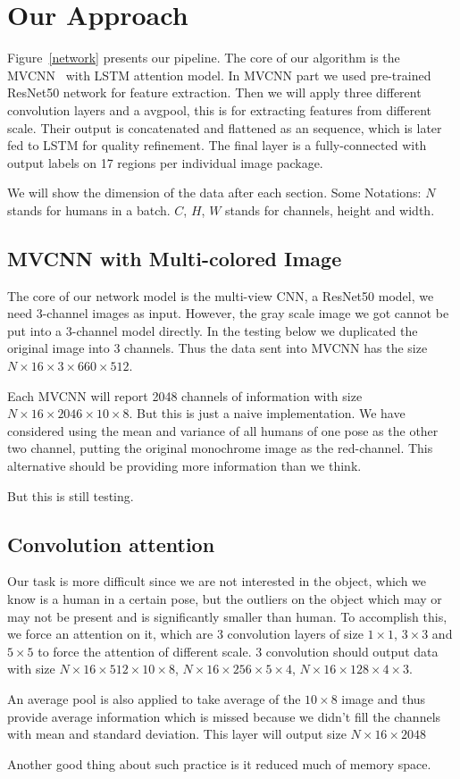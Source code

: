 \documentclass[conference,compsoc]{IEEEtran}
\begin{document}
\section{Our Approach}
Figure~\ref{network} presents our pipeline. The core of our algorithm is the MVCNN~\cite{su15mvcnn} with LSTM attention model. In MVCNN part we used pre-trained ResNet50\cite{he2016deep} network for feature extraction. Then we will apply three different convolution layers and a avgpool, this is for extracting features from different scale. Their output is concatenated and flattened as an sequence, which is later fed to LSTM for quality refinement. The final layer is a fully-connected with output labels on 17 regions per individual image package.
\par We will show the dimension of the data after each section. Some Notations: $N$ stands for humans in a batch. $C$, $H$, $W$ stands for channels, height and width.

\subsection{MVCNN with Multi-colored Image}
The core of our network model is the multi-view CNN, a ResNet50 model, we need 3-channel images as input. 
However, the gray scale image we got cannot be put into a 3-channel model directly. 
In the testing below we duplicated the original image into 3 channels. 
Thus the data sent into MVCNN has the size $N\times16\times 3\times 660 \times 512$.
\par 
Each MVCNN will report 2048 channels of information with size $N \times 16 \times 2046 \times 10 \times 8$.
But this is just a naive implementation. We have considered using the mean and variance of all humans of one pose as the other two channel, putting the original monochrome image as the red-channel. This alternative should be providing more information than we think. 
\par But this is still testing.

\subsection{Convolution attention}
Our task is more difficult since we are not interested in the object, which we know is a human in a certain pose, but the outliers on the object which may or may not be present and is significantly smaller than human. To accomplish this, we force an attention on it, which are 3 convolution layers of size $1\times1$, $3\times3$ and $5\times5$ to force the attention of different scale. 3 convolution should output data with size $N\times16\times512\times 10\times8$, $N\times16\times256\times5\times4$, $N\times16\times128\times4\times3$.
\par An average pool is also applied to take average of the $10\times8$ image and thus provide average information which is missed because we didn't fill the channels with mean and standard deviation. This layer will output size $N\times 16\times 2048$
\par Another good thing about such practice is it reduced much of memory space.
\end{document}
